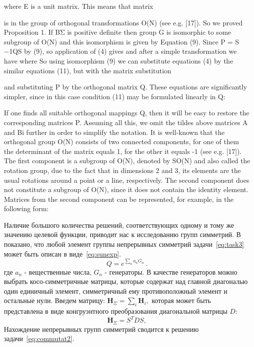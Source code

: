 where E is a unit matrix. This means that matrix

is in the group of orthogonal transformations O(N) (see e.g. [17]). So we proved
Proposition 1. If BΣ is positive definite then group G is isomorphic to some
subgroup of O(N) and this isomorphism is given by Equation (9).
Since P = S
−1QS by (9), so application of (4) gives
and after a simple transformation we have
where
So using isomorphism (9) we can substitute equations (4) by the similar equations (11), but with the matrix substitution


and substituting P by the orthogonal matrix Q. These equations are significantly
simpler, since in this case condition (11) may be formulated linearly in Q:


If one finds all suitable orthogonal mappings Q, then it will be easy to restore the
corresponding matrices P. Assuming all this, we omit the tildes above matrices A
and Bi further in order to simplify the notation.
It is well-known that the orthogonal group O(N) consists of two connected
components, for one of them the determinant of the matrix equals 1, for the
other it equals -1 (see e.g. [17]). The first component is a subgroup of O(N),
denoted by SO(N) and also called the rotation group, due to the fact that in
dimensions 2 and 3, its elements are the usual rotations around a point or a line,
respectively. The second component does not constitute a subgroup of O(N),
since it does not contain the identity element. Matrices from the second component can be represented, for example, in the following form:



Наличие большого количества решений, соответствующих одному и тому же значению целевой функции, приводит нас к исследованию групп симметрий. В~\cite{yurkov:symmetry} показано, что любой элемент группы непрерывных симметрий задачи~\ref{eq:task3} может быть описан в виде~\ref{eq:sunexp}.
\begin{equation}
\label{eq:sunexp}
Q=e^{\sum\limits_n a_n G_n} \, .
\end{equation}
где $a_n$ - вещественные числа, $G_n$ - генераторы. В качестве генераторов можно выбрать косо-симметричные матрицы, которые содержат над главной диагональю один единичный элемент, симметричный ему противоположный элемент и остальные нули.
Введем матрицу: $ {\textbf{H}}_{\Sigma} = \sum_{i} \textbf{H}_i,$ которая может быть представлена в виде конгруэнтного преобразования диагональной матрицы $D$:
$${\textbf{H}}_{\Sigma} = S^TDS,$$
Нахождение непрерывных групп симметрий сводится к решению задачи~\ref{eq:commutat2}.

